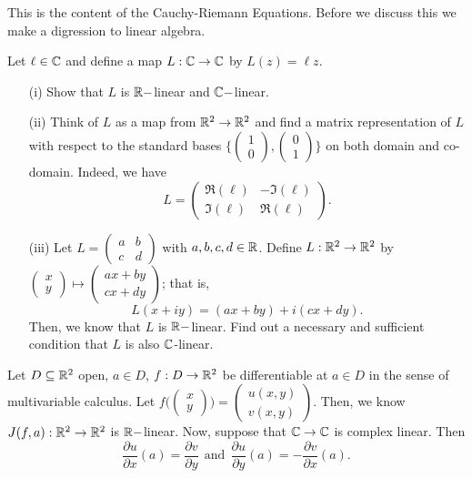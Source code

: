 \documentclass[a4paper]{article}
\begin{document}
This is the content of the Cauchy-Riemann Equations. Before we discuss this we make a digression to linear algebra. 

\begin{problem}
    Let \( \ell \in \mathbb{C}  \) and define a map \( L: \mathbb{C} \to \mathbb{C}  \) by \( L(z) = \ell z  \).
    \begin{enumerate}
        \item[(i)] Show that \( L  \) is \( \mathbb{R}- \)linear and \( \mathbb{C}- \)linear.
        \item[(ii)] Think of \( L  \) as a map from \( \mathbb{R}^{2} \to \mathbb{R}^{2} \) and find a matrix representation of \( L  \) with respect to the standard bases \( \Big\{ \begin{pmatrix} 1 \\ 0  \end{pmatrix} , \begin{pmatrix} 0 \\ 1  \end{pmatrix} \Big\}  \) on both domain and co-domain. Indeed, we have
            \[  L = \begin{pmatrix} \Re(\ell) & - \Im(\ell) \\ \Im(\ell) & \Re(\ell)  \end{pmatrix}. \]
        \item[(iii)] Let \( L = \begin{pmatrix} a & b \\ c & d  \end{pmatrix}  \) with \( a,b,c,d \in \mathbb{R}  \). Define \( L: \mathbb{R}^{2} \to \mathbb{R}^{2} \) by \( \begin{pmatrix} x \\ y  \end{pmatrix}  \mapsto \begin{pmatrix} ax + by \\ cx + dy \end{pmatrix}  \); that is, 
            \[  L(x+iy) = (ax+by) + i (cx+dy). \]
            Then, we know that \( L  \) is \( \mathbb{R}- \)linear. Find out a necessary and sufficient condition that \( L  \) is also \( \mathbb{C}  \)-linear.
    \end{enumerate}
\end{problem}

\begin{lemma}
   Let \( D \subseteq \mathbb{R}^{2} \) open, \( a \in D  \), \( f: D \to \mathbb{R}^{2} \) be differentiable at \( a \in D  \) in the sense of multivariable calculus. Let \( f \Big(  \begin{pmatrix} x \\ y  \end{pmatrix}  \Big) = \begin{pmatrix} u(x,y) \\ v(x,y) \end{pmatrix}  \). Then, we know \( J(f,a) : \mathbb{R}^{2} \to \mathbb{R}^{2} \) is \( \mathbb{R}- \)linear. Now, suppose that \( \mathbb{C} \to \mathbb{C}  \) is complex linear. Then 
   \[  \frac{\partial u }{\partial x } (a) = \frac{\partial v }{\partial y } \ \ \text{and} \ \ \frac{\partial u }{\partial y } (a) = - \frac{\partial v }{\partial x }  (a).  \]
\end{lemma}
\end{document}
